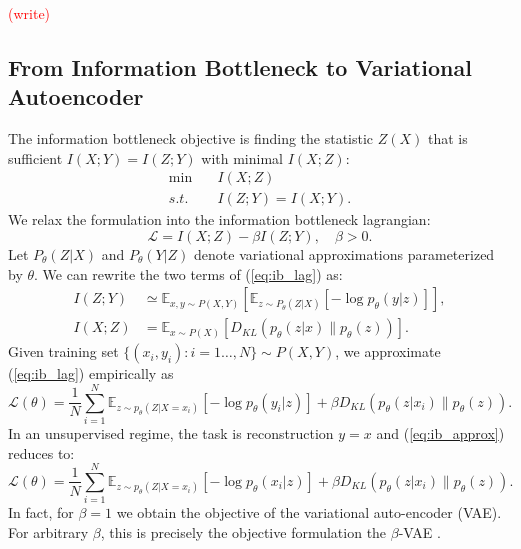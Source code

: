 \documentclass[11pt]{article}
\def\E{\mathbb{E}}
\newcommand\myworries[1]{\textcolor{red}{(#1)}}
\begin{document}
\myworries{write}

\subsection*{From Information Bottleneck to Variational Autoencoder}

The information bottleneck objective is finding the statistic $Z(X)$ that is sufficient $I(X;Y) = I(Z;Y)$ with minimal $I(X;Z)$:
\begin{align}
\min &\quad I(X; Z)\\
s.t. &\quad I(Z;Y)=I(X;Y).
\end{align}
We relax the formulation into the information bottleneck lagrangian:
\begin{equation}
\mathcal{L} =  I(X; Z) -\beta I(Z;Y),\quad\beta>0.
\label{eq:ib_lag}
\end{equation}
Let $P_\theta(Z\vert X)$ and $P_\theta(Y\vert Z)$ denote variational approximations parameterized by $\theta$. We can rewrite the two terms of (\ref{eq:ib_lag}) as:
\begin{align}
I(Z;Y) &\simeq \E_{x,y\sim P(X,Y)} \left[ \E_{z\sim P_\theta(Z\vert X)}[-\log p_\theta(y\vert z)] \right],\\
I(X; Z) &= \E_{x\sim P(X)}\left[ D_{KL}(p_\theta(z\vert x) \rVert p_\theta(z)) \right].
\end{align}
Given training set $\{(x_i,y_i):i=1\ldots,N\}\sim P(X,Y)$, we approximate (\ref{eq:ib_lag}) empirically as
\begin{equation}
\mathcal{L}(\theta) = \frac{1}{N}\sum_{i=1}^N \E_{z\sim p_\theta(Z\vert X=x_i)}[-\log p_\theta(y_i\vert z)] + \beta D_{KL}(p_\theta(z\vert x_i) \rVert p_\theta(z)).
\label{eq:ib_approx}
\end{equation}
In an unsupervised regime, the task is reconstruction $y=x$ and (\ref{eq:ib_approx}) reduces to:
\begin{equation}
\mathcal{L}(\theta) = \frac{1}{N}\sum_{i=1}^N \E_{z\sim p_\theta(Z\vert X=x_i)}[-\log p_\theta(x_i\vert z)] + \beta D_{KL}(p_\theta(z\vert x_i) \rVert p_\theta(z)).
\label{eq:ib_unsup}
\end{equation}
In fact, for $\beta=1$ we obtain the objective of the variational auto-encoder (VAE). For arbitrary $\beta$, this is precisely the objective formulation the $\beta$-VAE .
\end{document}
